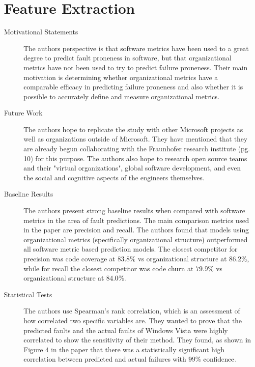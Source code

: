 \documentclass[english]{article}
\begin{document}
\section*{Feature Extraction}
\begin{description}
\item[{Motivational Statements}]  The authors perspective is that software metrics have been used to a great degree to predict fault proneness in software, but that organizational metrics have not been used to try to predict failure proneness.  Their main motivation is determining whether organizational metrics have a comparable efficacy in predicting failure proneness and also whether it is possible to accurately define and measure organizational metrics.

\item[{Future Work}] The authors hope to replicate the study with other Microsoft projects as well as organizations outside of Microsoft. They have mentioned that they are already begun collaborating with the Fraunhofer research institute (pg. 10) for this purpose. The authors also hope to research open source teams and their "virtual organizations", global software development, and even the social and cognitive aspects of the engineers themselves.

\item[{Baseline Results}]  The authors present strong baseline results when compared with software metrics in the area of fault predictions.  The main comparison metrics used in the paper are precision and recall.  The authors found that models using organizational metrics (specifically organizational structure) outperformed all software metric based prediction models.  The closest competitor for precision was code coverage at $83.8\%$ vs organizational structure at $86.2\%$, while for recall the closest competitor was code churn at $79.9\%$ vs organizational structure at $84.0\%$.

\item[{Statistical Tests}]  The authors use Spearman's rank correlation, which is an assessment of how correlated two specific variables are.  They wanted to prove that the predicted faults and the actual faults of Windows Vista were highly correlated to show the sensitivity of their method.  They found, as shown in Figure 4 in the paper that there was a statistically significant high correlation between predicted and actual failures with $99\%$ confidence.

\end{description}
\end{document}

